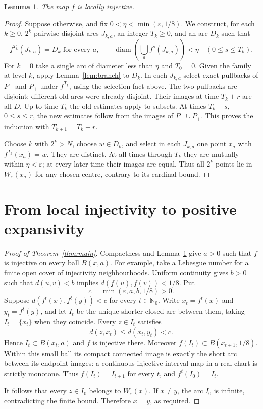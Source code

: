 \documentclass[11pt]{article}
\newtheorem{lemma}[theorem]{Lemma}
\newcommand{\N}{\mathbb N_0}
\newcommand{\diam}{\operatorname{diam}}
\begin{document}
\begin{lemma}\label{lem:local}
The map $f$ is locally injective.
\end{lemma}
\begin{proof}
Suppose otherwise, and fix $0<\eta<\min(\varepsilon,1/8)$. We construct, for each $k\ge0$, $2^k$ pairwise disjoint arcs $J_{k,a}$, an integer $T_k\ge0$, and an arc $D_k$ such that
\[
 f^{T_k}(J_{k,a})=D_k\text{ for every }a,\qquad
 \diam\left(\bigcup_a f^s(J_{k,a})\right)<\eta\quad(0\le s\le T_k).
\]
For $k=0$ take a single arc of diameter less than $\eta$ and $T_0=0$. Given the family at level $k$, apply Lemma~\ref{lem:branch} to $D_k$. In each $J_{k,a}$ select exact pullbacks of $P_-$ and $P_+$ under $f^{T_k}$, using the selection fact above. The two pullbacks are disjoint; different old arcs were already disjoint. Their images at time $T_k+r$ are all $D$. Up to time $T_k$ the old estimates apply to subsets. At times $T_k+s$, $0\le s\le r$, the new estimates follow from the images of $P_-\cup P_+$. This proves the induction with $T_{k+1}=T_k+r$.

Choose $k$ with $2^k>N$, choose $w\in D_k$, and select in each $J_{k,a}$ one point $x_a$ with $f^{T_k}(x_a)=w$. They are distinct. At all times through $T_k$ they are mutually within $\eta<\varepsilon$; at every later time their images are equal. Thus all $2^k$ points lie in $W_\varepsilon(x_a)$ for any chosen centre, contrary to its cardinal bound.
\end{proof}

\section{From local injectivity to positive expansivity}
\begin{proof}[Proof of Theorem~\ref{thm:main}]
Compactness and Lemma~\ref{lem:local} give $a>0$ such that $f$ is injective on every ball $B(x,a)$. For example, take a Lebesgue number for a finite open cover of injectivity neighbourhoods. Uniform continuity gives $b>0$ such that $d(u,v)<b$ implies $d(f(u),f(v))<1/8$. Put
\[
 c=\min(\varepsilon,a,b,1/8)>0.
\]
Suppose $d(f^t(x),f^t(y))<c$ for every $t\in\N$. Write $x_t=f^t(x)$ and $y_t=f^t(y)$, and let $I_t$ be the unique shorter closed arc between them, taking $I_t=\{x_t\}$ when they coincide. Every $z\in I_t$ satisfies
\[
 d(z,x_t)\le d(x_t,y_t)<c.
\]
Hence $I_t\subset B(x_t,a)$ and $f$ is injective there. Moreover $f(I_t)\subset B(x_{t+1},1/8)$. Within this small ball its compact connected image is exactly the short arc between its endpoint images: a continuous injective interval map in a real chart is strictly monotone. Thus $f(I_t)=I_{t+1}$ for every $t$, and $f^t(I_0)=I_t$.

It follows that every $z\in I_0$ belongs to $W_\varepsilon(x)$. If $x\ne y$, the arc $I_0$ is infinite, contradicting the finite bound. Therefore $x=y$, as required.
\end{proof}
\end{document}
